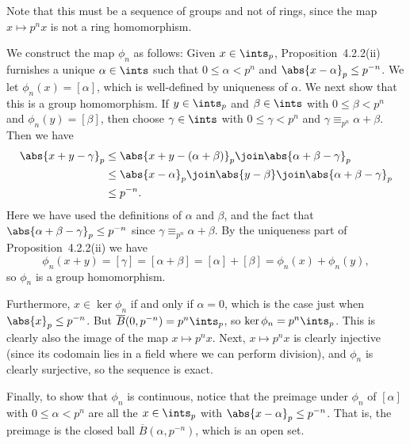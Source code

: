 \documentclass[a4paper, 11pt]{memoir}
\theoremstyle{plaincustomnumber}
\theoremstyle{changedotbreakcustomnumber}
\begin{document}
\begin{solution}
    Note that this must be a sequence of groups and not of rings, since the map $x \mapsto p^n x$ is not a ring homomorphism.

    We construct the map $\phi_n$ as follows: Given $x \in \ints_p$, Proposition~4.2.2(ii) furnishes a unique $\alpha \in \ints$ such that $0 \leq \alpha < p^n$ and $\abs{x - \alpha}_p \leq p^{-n}$. We let $\phi_n(x) = [\alpha]$, which is well-defined by uniqueness of $\alpha$. We next show that this is a group homomorphism. If $y \in \ints_p$ and $\beta \in \ints$ with $0 \leq \beta < p^n$ and $\phi_n(y) = [\beta]$, then choose $\gamma \in \ints$ with $0 \leq \gamma < p^n$ and $\gamma \equiv_{p^n} \alpha + \beta$. Then we have
    \begin{align*}
        \abs{x+y-\gamma}_p
            &\leq \abs{x+y-(\alpha+\beta)}_p \join \abs{\alpha+\beta-\gamma}_p \\
            &\leq \abs{x-\alpha}_p \join \abs{y-\beta} \join \abs{\alpha+\beta-\gamma}_p \\
            &\leq p^{-n}.
    \end{align*}
    Here we have used the definitions of $\alpha$ and $\beta$, and the fact that $\abs{\alpha+\beta-\gamma}_p \leq p^{-n}$ since $\gamma \equiv_{p^n} \alpha+\beta$. By the uniqueness part of Proposition~4.2.2(ii) we have
    \begin{equation*}
        \phi_n(x+y)
            = [\gamma]
            = [\alpha + \beta]
            = [\alpha] + [\beta]
            = \phi_n(x) + \phi_n(y),
    \end{equation*}
    so $\phi_n$ is a group homomorphism.
    
    Furthermore, $x \in \ker\phi_n$ if and only if $\alpha = 0$, which is the case just when $\abs{x}_p \leq p^{-n}$. But $\overline{B}(0,p^{-n}) = p^n \ints_p$, so $\ker\phi_n = p^n \ints_p$. This is clearly also the image of the map $x \mapsto p^n x$. Next, $x \mapsto p^n x$ is clearly injective (since its codomain lies in a field where we can perform division), and $\phi_n$ is clearly surjective, so the sequence is exact.

    Finally, to show that $\phi_n$ is continuous, notice that the preimage under $\phi_n$ of $[\alpha]$ with $0 \leq \alpha < p^n$ are all the $x \in \ints_p$ with $\abs{x-\alpha}_p \leq p^{-n}$. That is, the preimage is the closed ball $\overline{B}(\alpha,p^{-n})$, which is an open set.


\end{solution}
\end{document}
